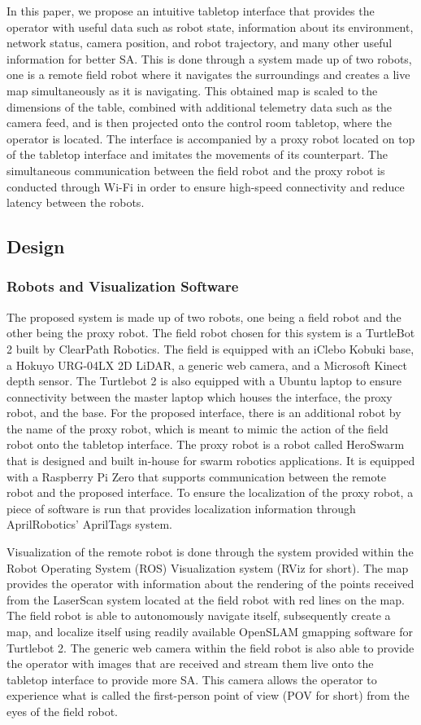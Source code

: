 \documentclass[conference]{IEEEtran}
\begin{document}
In this paper, we propose an intuitive tabletop interface that provides the operator with useful data such as robot state, information about its environment, network status, camera position, and robot trajectory, and many other useful information for better SA. This is done through a system made up of two robots, one is a remote field robot where it navigates the surroundings and creates a live map simultaneously as it is navigating. This obtained map is  scaled to the dimensions of the table, combined with additional telemetry data such as the camera feed, and is then projected onto the control room tabletop, where the operator is located. The interface is accompanied by a proxy robot located on top of the tabletop interface and imitates the movements of its counterpart. The simultaneous communication between the field robot and the proxy robot is conducted through Wi-Fi in order to ensure high-speed connectivity and reduce latency between the robots. 


\subsection{Design}
\subsubsection{Robots and Visualization Software}
The proposed system is made up of two robots, one being a field robot and the other being the proxy robot. The field robot chosen for this system is a TurtleBot 2 built by ClearPath Robotics. \cite{b21} The field is equipped with an iClebo Kobuki base, a Hokuyo URG-04LX 2D LiDAR, a generic web camera, and a Microsoft Kinect depth sensor. The Turtlebot 2 is also equipped with a Ubuntu laptop to ensure connectivity between the master laptop which houses the interface, the proxy robot, and the base. For the proposed interface, there is an additional robot by the name of the proxy robot, which is meant to mimic the action of the field robot onto the tabletop interface. The proxy robot is a robot called HeroSwarm that is designed and built in-house for swarm robotics applications.\cite{b22} It is equipped with a Raspberry Pi Zero that supports communication between the remote robot and the proposed interface. To ensure the localization of the proxy robot, a piece of software is run that provides localization information through AprilRobotics' AprilTags system. \cite{b23}

Visualization of the remote robot is done through the system provided within the Robot Operating System (ROS) Visualization system (RViz for short). The map provides the operator with information about the rendering of the points received from the LaserScan system located at the field robot with red lines on the map. The field robot is able to autonomously navigate itself, subsequently create a map, and localize itself using readily available OpenSLAM gmapping software for Turtlebot 2. \cite{b24} The generic web camera within the field robot is also able to provide the operator with images that are received and stream them live onto the tabletop interface to provide more SA. This camera allows the operator to experience what is called the first-person point of view (POV for short) from the eyes of the field robot. 
\end{document}
